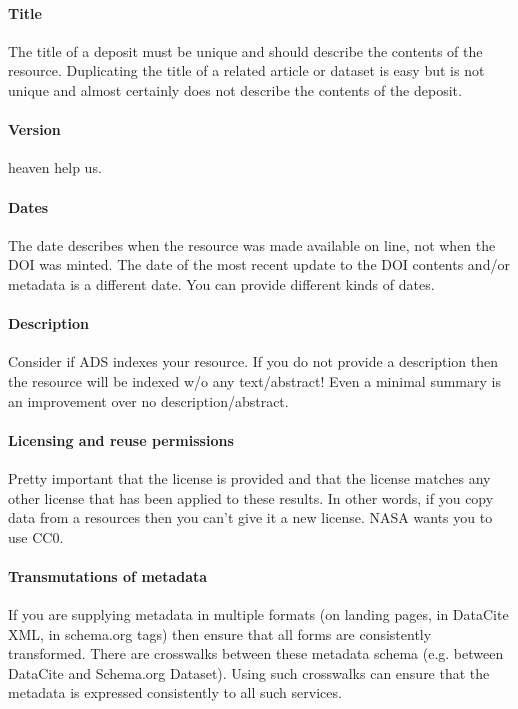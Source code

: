 \documentclass[11pt,a4paper]{ivoa}
\begin{document}
\paragraph{Title} 
The title of a deposit must be unique and should describe the contents of the resource. 
Duplicating the title of a related article or dataset is easy but is not unique and almost certainly does not describe the contents of the deposit.

\paragraph{Version} 
heaven help us.

\paragraph{Dates} 
The date describes when the resource was made available on line, not when the DOI was minted. The date of the most recent update to the DOI contents and/or metadata is a different date. You can provide different kinds of dates.

\paragraph{Description} 
Consider if ADS indexes your resource. If you do not provide a description then the resource will be indexed w/o any text/abstract! Even a minimal summary is an improvement over no description/abstract.

\paragraph{Licensing and reuse permissions} 
Pretty important that the license is provided and that the license matches any other license that has been applied to these results. 
In other words, if you copy data from a resources then you can't give it a new license.
NASA wants you to use CC0.

\paragraph{Transmutations of metadata} 
If you are supplying metadata in multiple formats (on landing pages, in DataCite XML, in schema.org tags) then ensure that all forms are consistently transformed. 
There are crosswalks between these metadata schema (e.g. between DataCite and Schema.org Dataset). 
Using such crosswalks can ensure that the metadata is expressed consistently to all such services.
\end{document}

